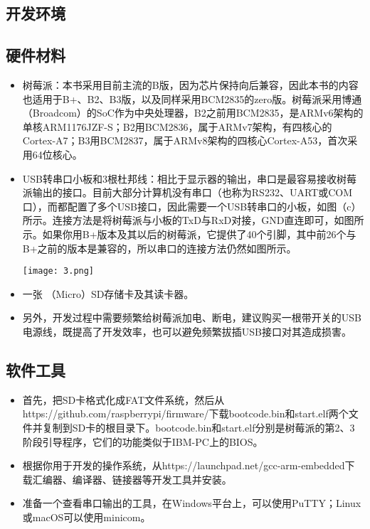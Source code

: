 \documentclass[main.tex]{subfiles}
\begin{document}
\begin{CJK*}{UTF8}{song}
\section{开发环境}

\subsection{硬件材料}
\begin{itemize}
\item 树莓派：本书采用目前主流的B版，因为芯片保持向后兼容，因此本书的内容也适用于B+、B2、B3版，以及同样采用BCM2835的zero版。树莓派采用博通（Broadcom）的SoC作为中央处理器，B2之前用BCM2835，是ARMv6架构的单核ARM1176JZF-S；B2用BCM2836，属于ARMv7架构，有四核心的Cortex-A7；B3用BCM2837，属于ARMv8架构的四核心Cortex-A53，首次采用64位核心。

\item USB转串口小板和3根杜邦线：相比于显示器的输出，串口是最容易接收树莓派输出的接口。目前大部分计算机没有串口（也称为RS232、UART或COM口），而都配置了多个USB接口，因此需要一个USB转串口的小板，如图（c）所示。连接方法是将树莓派与小板的TxD与RxD对接，GND直连即可，如图所示。如果你用B+版本及其以后的树莓派，它提供了40个引脚，其中前26个与B+之前的版本是兼容的，所以串口的连接方法仍然如图所示。

\texttt{[image: 3.png]}

\item 一张 （Micro）SD存储卡及其读卡器。

\item 另外，开发过程中需要频繁给树莓派加电、断电，建议购买一根带开关的USB电源线，既提高了开发效率，也可以避免频繁拔插USB接口对其造成损害。
\end{itemize}

\subsection{软件工具}
\begin{itemize}
\item 首先，把SD卡格式化成FAT文件系统，然后从https://github.com/raspberrypi/firmware/下载bootcode.bin和start.elf两个文件并复制到SD卡的根目录下。bootcode.bin和start.elf分别是树莓派的第2、3阶段引导程序，它们的功能类似于IBM-PC上的BIOS。
\item 根据你用于开发的操作系统，从https://launchpad.net/gcc-arm-embedded下载汇编器、编译器、链接器等开发工具并安装。
\item 准备一个查看串口输出的工具，在Windows平台上，可以使用PuTTY；Linux或macOS可以使用minicom。
\end{itemize}

\clearpage
\end{CJK*}
\end{document}
